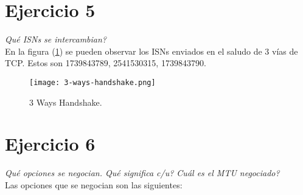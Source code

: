 \documentclass[osajnl,twocolumn,showpacs,superscriptaddress,10pt]{revtex4-1} %
\begin{document}
\section{Ejercicio 5}

\textit{Qué ISNs se intercambian?} \\

En la figura (\ref{3-ways-handshake}) se pueden observar los ISNs enviados en el saludo de 3 vías de TCP.
Estos son 1739843789, 2541530315, 1739843790.

\begin{figure}[H]
    \centering
    \texttt{[image: 3-ways-handshake.png]}
    \caption{3 Ways Handshake.}
    \label{3-ways-handshake}
\end{figure}

\section{Ejercicio 6}

\textit{Qué opciones se negocian. Qué significa c/u? Cuál es el MTU negociado?} \\

Las opciones que se negocian son las siguientes:
\end{document}
